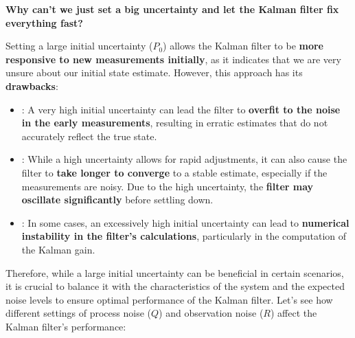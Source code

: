 \begin{flushleft}
    \textcolor{Red2}{ \textbf{Why can't we just set a big uncertainty and let the Kalman filter fix everything fast?}}
\end{flushleft}
Setting a large initial uncertainty ($P_0$) allows the Kalman filter to be \textbf{more responsive to new measurements initially}, as it indicates that we are very unsure about our initial state estimate. However, this approach has its \textbf{drawbacks}:
\begin{itemize}
    \item {}: A very high initial uncertainty can lead the filter to \textbf{overfit to the noise in the early measurements}, resulting in erratic estimates that do not accurately reflect the true state.
    \item {}: While a high uncertainty allows for rapid adjustments, it can also cause the filter to \textbf{take longer to converge} to a stable estimate, especially if the measurements are noisy. Due to the high uncertainty, the \textbf{filter may oscillate significantly} before settling down.
    \item {}: In some cases, an excessively high initial uncertainty can lead to \textbf{numerical instability in the filter's calculations}, particularly in the computation of the Kalman gain.
\end{itemize}
Therefore, while a large initial uncertainty can be beneficial in certain scenarios, it is crucial to balance it with the characteristics of the system and the expected noise levels to ensure optimal performance of the Kalman filter. Let's see how different settings of process noise ($Q$) and observation noise ($R$) affect the Kalman filter's performance:
